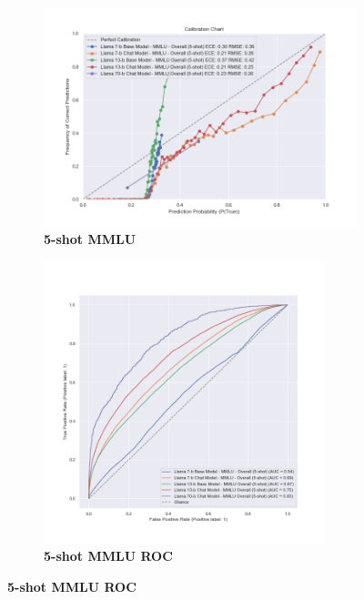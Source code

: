 \documentclass[11pt]{article}
\begin{document}
\begin{figure}
\begin{subfigure}[b]{0.38\textwidth}
    \end{subfigure}  
     \hfill
     \begin{subfigure}[b]{0.60\textwidth}
         \centering
         \includegraphics[width=1.1\textwidth]{figures/5-shot-MMLU.png}
         \caption{\textbf{5-shot MMLU} }
         \label{fig:5-shot-logicqa}
     \end{subfigure}     
     \begin{subfigure}[b]{0.38\textwidth}
         \centering 
         \includegraphics[width=0.9\textwidth]{figures/5-shot-MMLU-roc.png}
         \caption{\textbf{5-shot MMLU ROC} }
         \label{fig:0-shot-MMLU}
    \end{subfigure} 
    

\end{figure}
\end{document}
